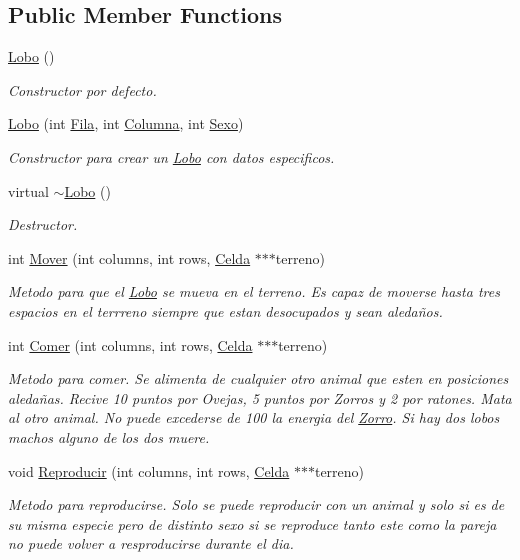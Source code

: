 \subsection*{Public Member Functions}
\begin{DoxyCompactItemize}
\item 
\hyperlink{classLobo_a5c6b593887d794ea47abcc7af82a4090}{Lobo} ()
\begin{DoxyCompactList}\small\item\em Constructor por defecto. \end{DoxyCompactList}\item 
\hyperlink{classLobo_a2424bb5ebc7f52b2255b53c8d1560413}{Lobo} (int \hyperlink{classAnimal_ab403adfd13b57143eff123bdd6a2febb}{Fila}, int \hyperlink{classAnimal_a340d64e6e4ffe5f35e0855c63aad1bd3}{Columna}, int \hyperlink{classAnimal_a42b629ae5a7e0c05263a3f6e592ea116}{Sexo})
\begin{DoxyCompactList}\small\item\em Constructor para crear un \hyperlink{classLobo}{Lobo} con datos especificos. \end{DoxyCompactList}\item 
virtual \hyperlink{classLobo_ac3f55f7ba044fc5a20fbcbeed644ce54}{$\sim$\+Lobo} ()
\begin{DoxyCompactList}\small\item\em Destructor. \end{DoxyCompactList}\item 
int \hyperlink{classLobo_af373be32ff2bc56162b7886e3de4b8c5}{Mover} (int columns, int rows, \hyperlink{classCelda}{Celda} $\ast$$\ast$$\ast$terreno)
\begin{DoxyCompactList}\small\item\em Metodo para que el \hyperlink{classLobo}{Lobo} se mueva en el terreno. Es capaz de moverse hasta tres espacios en el terrreno siempre que estan desocupados y sean aledaños. \end{DoxyCompactList}\item 
int \hyperlink{classLobo_a6da7977c9f5f955b20919648345ca550}{Comer} (int columns, int rows, \hyperlink{classCelda}{Celda} $\ast$$\ast$$\ast$terreno)
\begin{DoxyCompactList}\small\item\em Metodo para comer. Se alimenta de cualquier otro animal que esten en posiciones aledañas. Recive 10 puntos por Ovejas, 5 puntos por Zorros y 2 por ratones. Mata al otro animal. No puede excederse de 100 la energia del \hyperlink{classZorro}{Zorro}. Si hay dos lobos machos alguno de los dos muere. \end{DoxyCompactList}\item 
void \hyperlink{classLobo_a79ea0886836c5c493a8bac08ef32db5c}{Reproducir} (int columns, int rows, \hyperlink{classCelda}{Celda} $\ast$$\ast$$\ast$terreno)
\begin{DoxyCompactList}\small\item\em Metodo para reproducirse. Solo se puede reproducir con un animal y solo si es de su misma especie pero de distinto sexo si se reproduce tanto este como la pareja no puede volver a resproducirse durante el dia. \end{DoxyCompactList}\end{DoxyCompactItemize}
